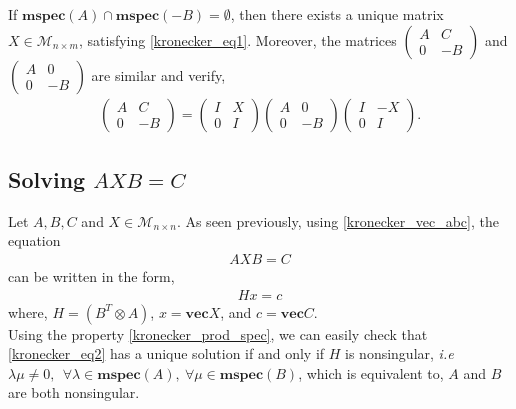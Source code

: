 \begin{proposition}
If $\mathbf{mspec}(A) \cap \mathbf{mspec}(-B) = \emptyset$, then there exists a unique matrix $X \in \mathcal{M}_{n \times m}$, satisfying \ref{kronecker_eq1}. Moreover, the matrices $\left(\begin{array}{cc}
A & C
\\
0 & -B
\end{array}\right)$ and $\left(\begin{array}{cc}
A & 0
\\
0 & -B
\end{array}\right)$ are similar and verify,
\begin{align}
\left(\begin{array}{cc}
A & C
\\
0 & -B
\end{array}\right) = \left(\begin{array}{cc}
I & X
\\
0 & I
\end{array}\right)
\left(\begin{array}{cc}
A & 0
\\
0 & -B
\end{array}\right)
\left(\begin{array}{cc}
I & -X
\\
0 & I
\end{array}\right).
\end{align}
\end{proposition}

\subsection{Solving $AXB=C$}
Let $A,B,C$ and $X \in \mathcal{M}_{n \times n}$. As seen previously, using \ref{kronecker_vec_abc}, the equation 
\begin{align}
\label{kronecker_eq2}
AXB=C
\end{align}
can be written in the form,
\begin{align}
H x = c
\end{align}
where,
$H = (B^T \otimes A)$, $x = \mathbf{vec}X $, and $c = \mathbf{vec}C$.
\\
Using the property \ref{kronecker_prod_spec}, we can easily check that \ref{kronecker_eq2} has a unique solution if and only if $H$ is nonsingular, \textit{i.e} $\lambda  \mu \neq 0,~~\forall \lambda \in \mathbf{mspec}(A),~\forall \mu \in \mathbf{mspec}(B)$, which is equivalent to, $A$ and $B$ are both nonsingular.

